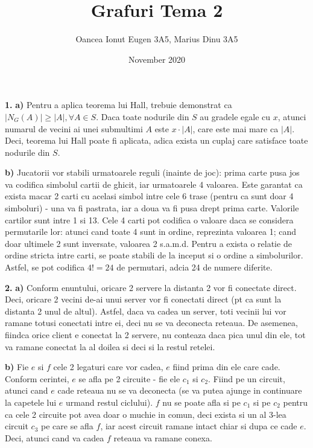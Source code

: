 \documentclass{article}
\title{Grafuri Tema 2}
\author{Oancea Ionut Eugen 3A5, Marius Dinu 3A5}
\date{November 2020}
\begin{document}
\maketitle

{\bf 1.} {\bf a)} Pentru a aplica teorema lui Hall, trebuie demonstrat ca $|N_G(A)| \geq |A|, \forall A \in S$. Daca toate nodurile din $S$ au gradele egale cu $x$, atunci numarul de vecini ai unei submultimi $A$ este $x \cdot |A|$, care este mai mare ca $|A|$. Deci, teorema lui Hall poate fi aplicata, adica exista un cuplaj care satisface toate nodurile din $S$.

{\bf b)} Jucatorii vor stabili urmatoarele reguli (inainte de joc): prima carte pusa jos va codifica simbolul cartii de ghicit, iar urmatoarele 4 valoarea. Este garantat ca exista macar 2 carti cu acelasi simbol intre cele 6 trase (pentru ca sunt doar 4 simboluri) - una va fi pastrata, iar a doua va fi pusa drept prima carte. Valorile cartilor sunt intre 1 si 13. Cele 4 carti pot codifica o valoare daca se considera permutarile lor: atunci cand toate 4 sunt in ordine, reprezinta valoarea 1; cand doar ultimele 2 sunt inversate, valoarea 2 s.a.m.d. Pentru a exista o relatie de ordine stricta intre carti, se poate stabili de la inceput si o ordine a simbolurilor. Astfel, se pot codifica $4! = 24$ de permutari, adcia 24 de numere diferite.
\vspace{1cm}

{\bf 2.} {\bf a)} Conform enuntului, oricare 2 servere la distanta 2 vor fi conectate direct. Deci, oricare 2 vecini de-ai unui server vor fi conectati direct (pt ca sunt la distanta 2 unul de altul). Astfel, daca va cadea un server, toti vecinii lui vor ramane totusi conectati intre ei, deci nu se va deconecta reteaua. De asemenea, fiindca orice client e conectat la 2 servere, nu conteaza daca pica unul din ele, tot va ramane conectat la al doilea si deci si la restul retelei.

{\bf b)} Fie $e$ si $f$ cele 2 legaturi care vor cadea, $e$ fiind prima din ele care cade. Conform cerintei, $e$ se afla pe 2 circuite - fie ele $c_1$ si $c_2$. Fiind pe un circuit, atunci cand $e$ cade reteaua nu se va deconecta (se va putea ajunge in continuare la capetele lui $e$ urmand restul ciclului). $f$ nu se poate afla si pe $c_1$ si pe $c_2$ pentru ca cele 2 circuite pot avea doar o muchie in comun, deci exista si un al 3-lea circuit $c_3$ pe care se afla $f$, iar acest circuit ramane intact chiar si dupa ce cade $e$. Deci, atunci cand va cadea $f$ reteaua va ramane conexa.
\vspace{1cm}
\end{document}
